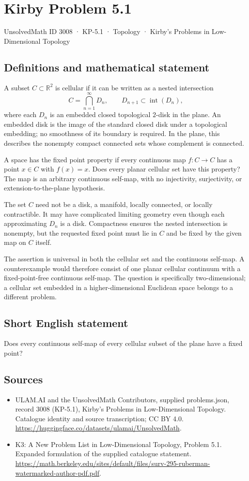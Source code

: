 \documentclass[11pt,a4paper]{article}
\begin{document}
\section*{Kirby Problem 5.1}\label{3008}
{\small UnsolvedMath ID 3008 · KP-5.1 · Topology · Kirby's Problems in Low-Dimensional Topology}
\subsection{Definitions and mathematical statement}
A subset $C\subset\mathbb R^2$ is cellular if it can be written
as a nested intersection
\[
 C=\bigcap_{n=1}^{\infty}D_n,\qquad
 D_{n+1}\subset\operatorname{int}(D_n),
\]
where each $D_n$ is an embedded closed topological $2$-disk in
the plane. An embedded disk is the image of the standard closed
disk under a topological embedding; no smoothness of its boundary
is required. In the plane, this describes the nonempty compact
connected sets whose complement is connected.

A space has the fixed point property if every continuous map
$f:C\to C$ has a point $x\in C$ with $f(x)=x$.
Does every planar cellular set have this property? The map is
an arbitrary continuous self-map, with no injectivity, surjectivity,
or extension-to-the-plane hypothesis.

The set $C$ need not be a disk, a manifold, locally connected,
or locally contractible. It may have complicated limiting geometry
even though each approximating $D_n$ is a disk. Compactness
ensures the nested intersection is nonempty, but the requested
fixed point must lie in $C$ and be fixed by the given map on
$C$ itself.

The assertion is universal in both the cellular set and the
continuous self-map. A counterexample would therefore consist of
one planar cellular continuum with a fixed-point-free continuous
self-map. The question is specifically two-dimensional; a cellular
set embedded in a higher-dimensional Euclidean space belongs to
a different problem.
\subsection{Short English statement}
Does every continuous self-map of every cellular subset of the plane have a fixed point?
\subsection{Sources}
\begin{itemize}
\item[S1] ULAM.AI and the UnsolvedMath Contributors, supplied problems.json, record 3008 (KP-5.1), Kirby's Problems in Low-Dimensional Topology. Catalogue identity and source transcription; CC BY 4.0.
\url{https://huggingface.co/datasets/ulamai/UnsolvedMath}.
\item[S2] K3: A New Problem List in Low-Dimensional Topology, Problem 5.1. Expanded formulation of the supplied catalogue statement.
\url{https://math.berkeley.edu/sites/default/files/surv-295-ruberman-watermarked-author-pdf.pdf}.
\end{itemize}
\end{document}

